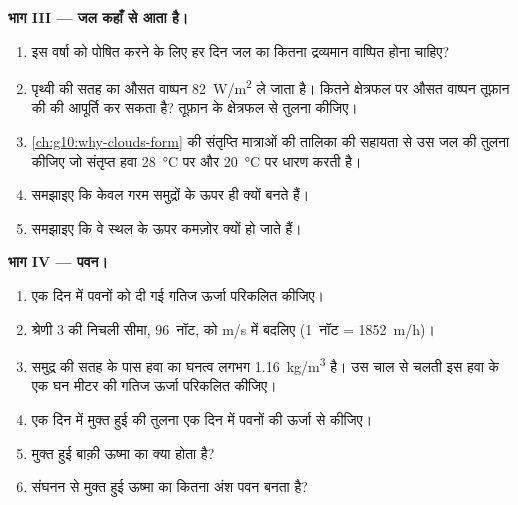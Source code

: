 \begin{problem}
\medskip
\noindent\textbf{भाग III --- जल कहाँ से आता है।}
\begin{enumerate}[resume]
  \item इस वर्षा को पोषित करने के लिए हर दिन जल का कितना द्रव्यमान वाष्पित होना चाहिए?
  \item पृथ्वी की सतह का औसत वाष्पन \qty{82}{W/m^2} ले जाता है।
        कितने क्षेत्रफल पर औसत वाष्पन तूफ़ान की  की आपूर्ति कर सकता
        है? तूफ़ान के क्षेत्रफल से तुलना कीजिए।
  \item \cref{ch:g10:why-clouds-form} की संतृप्ति मात्राओं की तालिका की
        सहायता से उस जल की तुलना कीजिए जो संतृप्त हवा
        \qty{28}{\degreeCelsius} पर और \qty{20}{\degreeCelsius} पर धारण करती है।
  \item समझाइए कि  केवल गरम समुद्रों के ऊपर ही क्यों बनते हैं।
  \item समझाइए कि वे स्थल के ऊपर कमज़ोर क्यों हो जाते हैं।
\end{enumerate}

\medskip
\noindent\textbf{भाग IV --- पवन।}
\begin{enumerate}[resume]
  \item एक दिन में पवनों को दी गई गतिज ऊर्जा परिकलित कीजिए।
  \item श्रेणी 3 की निचली सीमा, \num{96}~नॉट, को
        \unit{m/s} में बदलिए (\num{1}~नॉट = \qty{1852}{m/h})।
  \item समुद्र की सतह के पास हवा का घनत्व लगभग
        \qty{1.16}{kg/m^3} है। उस चाल से चलती इस हवा के एक घन मीटर की गतिज
        ऊर्जा परिकलित कीजिए।
  \item एक दिन में मुक्त हुई  की तुलना एक दिन में पवनों की
        ऊर्जा से कीजिए।
  \item मुक्त हुई बाक़ी ऊष्मा का क्या होता है?
  \item संघनन से मुक्त हुई ऊष्मा का कितना अंश पवन बनता है?
\end{enumerate}
\end{problem}
